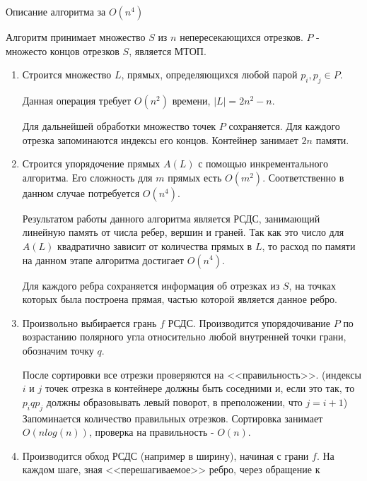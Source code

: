 \documentclass[letterpaper,12pt]{article}
\begin{document}
\begin{center}
Описание алгоритма за $O(n^4)$
\end{center}
\par
Алгоритм принимает множество $S$ из $n$ непересекающихся отрезков.
$P$ - множесто концов отрезков $S$, является МТОП.
\begin{enumerate}
      \item Строится множество $L$, прямых, определяющихся любой парой 
            $p_i, p_j \in P$.
            \par
            Данная операция требует $O(n^2)$ времени, $|L| = 2n^2-n$.
            \par
            Для дальнейшей обработки множество точек $P$ сохраняется.
            Для каждого отрезка запоминаются индексы его концов.
            Контейнер занимает $2n$ памяти.
      \item Строится упорядочение прямых $A(L)$ с помощью 
            инкрементального алгоритма. Его сложность для $m$ прямых
            есть $O(m^2)$. Соответственно в данном случае потребуется
            $O(n^4)$.
            \par
            Результатом работы данного алгоритма является РСДС,
            занимающий линейную память от числа ребер, вершин и граней.
            Так как это число для $A(L)$ квадратично зависит от количества
            прямых в $L$, то расход по памяти на данном этапе алгоритма 
            достигает $O(n^4)$.
            \par
            Для каждого ребра сохраняется информация об отрезках из $S$,
            на точках которых была построена прямая, 
            частью которой является данное ребро.
      \item Произвольно выбирается грань $f$ РСДС. Производится 
            упорядочивание $P$ по возрастанию полярного угла относительно 
            любой внутренней точки грани, обозначим точку $q$.
            \par
            После сортировки все отрезки проверяются на <<правильность>>.
            (индексы $i$ и $j$ точек отрезка в контейнере должны быть соседними
            и, если это так, то $p_i q p_j$ должны образовывать левый поворот,
            в преположении, что $j = i + 1$)
            Запоминается количество правильных отрезков. Сортировка занимает 
            $O(nlog(n))$, проверка на правильность - $O(n)$.
      \item Производится обход РСДС (например в ширину), начиная с грани $f$. 
            На каждом шаге, зная <<перешагиваемое>> ребро, через обращение к 

\end{enumerate}
\end{document}
